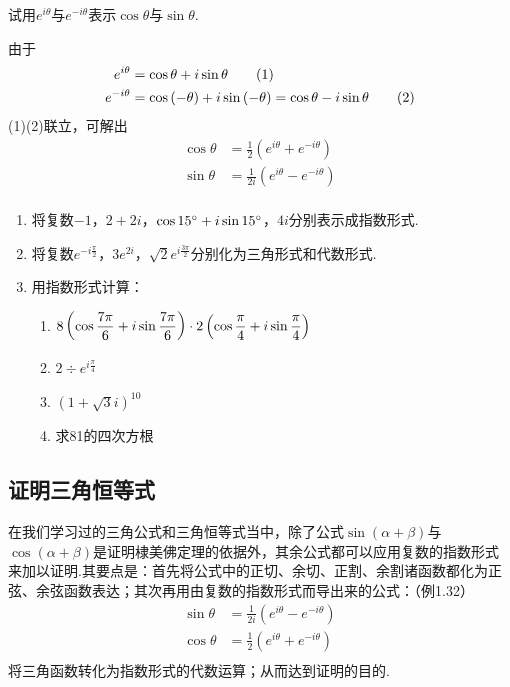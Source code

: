 \begin{example}
试用$e^{i\theta}$与$e^{-i\theta}$表示$\cos\theta$与$\sin\theta$.    
\end{example}

\begin{solution}
由于
\begin{align}
e^{i\theta}&= \cos{\theta}+i\sin{\theta} \tag{1}\\
e^{-i\theta}&= \cos\left(-\theta\right)+i\sin\left(-\theta\right)=\cos\theta-i\sin\theta \tag{2}
\end{align}
(1)(2)联立，可解出
\[\begin{split}
    \cos\theta&=\frac{1}{2}\left(e^{i\theta}+e^{-i\theta}\right)\\
    \sin\theta&=\frac{1}{2i}\left(e^{i\theta}-e^{-i\theta}\right)\\
\end{split}\]
\end{solution}

\begin{ex}
\begin{enumerate}
    \item 将复数$-1$，$2+2i$，$\cos{15^{\circ}}+i\sin{15^{\circ}}$，$4i$分别表示成指数形式.
    \item 将复数$e^{-i\tfrac{\pi}{2}}$，$3e^{2i}$，$\sqrt{2}e^{i\tfrac{3\pi}{2}}$分别化为三角形式和代数形式.
    \item 用指数形式计算：
\begin{enumerate}[(1)]
    \item $8\left(\cos{\dfrac{7\pi}{6}}+i\sin{\dfrac{7\pi}{6}}\right)\cdot 2\left(\cos{\dfrac{\pi}{4}}+i\sin{\dfrac{\pi}{4}}\right)$
    \item $2\div e^{i\tfrac{\pi}{4}}$
    \item $(1+\sqrt{3}i)^{10}$
    \item 求81的四次方根
\end{enumerate}
\end{enumerate}
\end{ex}

\subsection{证明三角恒等式}

在我们学习过的三角公式和三角恒等式当中，除了公式$\sin(\alpha+\beta)$与$\cos(\alpha+\beta)$是证明棣美佛定理的依据外，其余公式都可以应用复数的指数形式来加以证明.其要点是：首先将公式中的正切、余切、正割、余割诸函数都化为正弦、余弦函数表达；其次再用由复数的指数形式而导出来的公式：（例1.32）
\[\begin{split}
\sin\theta&=\frac{1}{2i}\left(e^{i\theta}-e^{-i\theta}\right)\\
    \cos\theta&=\frac{1}{2}\left(e^{i\theta}+e^{-i\theta}\right)\\
    \end{split}\]
将三角函数转化为指数形式的代数运算；从而达到证明的目的.

